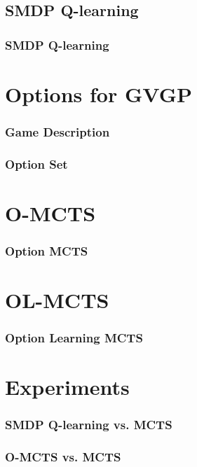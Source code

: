 \documentclass[aspectratio=169]{beamer}
\begin{document}
\subsection{SMDP Q-learning}
\begin{frame}
	\frametitle{SMDP Q-learning \cite{sutton1999between}}
\end{frame}

\section{Options for GVGP}
\begin{frame}
	\frametitle{Game Description}
\end{frame}

\begin{frame}
	\frametitle{Option Set}
\end{frame}

\section{O-MCTS}
\begin{frame}
	\frametitle{Option MCTS}
\end{frame}

\section{OL-MCTS}
\begin{frame}
	\frametitle{Option Learning MCTS}
\end{frame}

\section{Experiments}
\begin{frame}
	\frametitle{SMDP Q-learning vs. MCTS}
	\begin{figure}
	\centering
	\end{figure}
	\begin{figure}
	\centering
	\end{figure}
\end{frame}

\begin{frame}
	\frametitle{O-MCTS vs. MCTS}
	\begin{figure}
	\centering
	\end{figure}
	\begin{figure}
	\centering
	\end{figure}
\end{frame}
\end{document}
